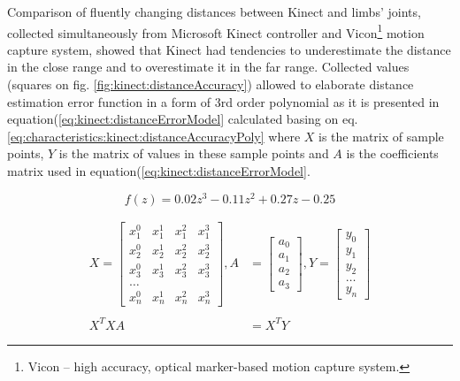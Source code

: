 \documentclass[sensors,article,submit,moreauthors,pdftex,10pt,a4paper]{mdpi}
\begin{document}
Comparison of fluently changing distances between Kinect and limbs' joints, collected simultaneously from Microsoft Kinect controller and Vicon\footnote{Vicon -- high accuracy, optical marker-based motion capture system.} motion capture system, showed that Kinect had tendencies to underestimate the distance in the close range and to overestimate it in the far range. Collected values (squares on fig. \ref{fig:kinect:distanceAccuracy}) allowed to elaborate distance estimation error function in a form of 3rd order polynomial as it is presented in equation(\ref{eq:kinect:distanceErrorModel} calculated basing on eq. \ref{eq:characteristics:kinect:distanceAccuracyPoly} where $X$ is the matrix of sample points, $Y$ is the matrix of values in these sample points and $A$ is the coefficients matrix used in equation(\ref{eq:kinect:distanceErrorModel}. 

\begin{equation}
	f(z)=0.02z^3-0.11z^2+0.27z-0.25 
	\label{eq:kinect:distanceErrorModel}
\end{equation}

\begin{equation}
\begin{split}
X = 	\begin{bmatrix}
x_1^0&x_1^1&x_1^2&x_1^3\\
x_2^0&x_2^1&x_2^2&x_2^3\\
x_3^0&x_3^1&x_3^2&x_3^3\\
\dots\\
x_n^0&x_n^1&x_n^2&x_n^3
\end{bmatrix} ,
A &= 	\begin{bmatrix}
a_0\\a_1\\a_2\\a_3
\end{bmatrix} ,
Y = 
\begin{bmatrix}
y_0 \\y_1\\y_2\\\dots\\y_n
\end{bmatrix} \\
& \\
X^TXA &= X^TY
\end{split}
\label{eq:characteristics:kinect:distanceAccuracyPoly}
\end{equation}
\end{document}
